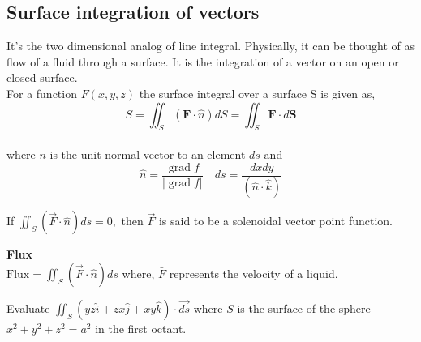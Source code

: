 \subsection{Surface integration of vectors}

It's the two dimensional analog of line integral. Physically, it can be thought of as flow of a fluid through a surface. It is 
the integration of a vector on an open or closed surface.\\
For a function $F(x,y,z)$ the surface integral over a surface S is given as,$$S=\iint_{S}(\mathbf{F} \cdot \hat{n}) d S=\iint_{S} \mathbf{F} \cdot d \mathbf{S}$$
\\
 where $n$ is the unit normal vector to an element $d s$ and
$$
\hat{n}=\frac{\operatorname{grad} f}{|\operatorname{grad} f|} \quad d s=\frac{d x d y}{(\hat{n} \cdot \hat{k})}
$$
\begin{note}
If $\iint_{S}(\vec{F} \cdot \hat{n}) d s=0,$ then $\vec{F}$ is said to be a solenoidal vector point function.	
\end{note}
\begin{example}\hspace{0.5cm}\textbf{Flux}\\
	$\mathrm{Flux}=\iint_{S}(\vec{F} \cdot \hat{n}) d s$ where, $\bar{F}$ represents the velocity of a liquid.
\end{example}
\begin{exercise}
	Evaluate $\iint_{S}(y z \hat{i}+z x \hat{j}+x y \hat{k}) \cdot \overrightarrow{d s}$ where $S$ is the surface of the sphere
	$x^{2}+y^{2}+z^{2}=a^{2}$ in the first octant. \end{exercise}
